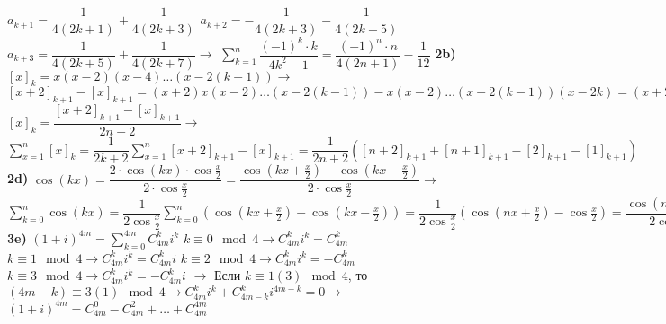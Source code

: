 \documentclass[12pt,a4paper,fleqn]{article}
\begin{document}
$a_{k + 1} = \dfrac{1}{4(2k + 1)} + \dfrac{1}{4(2k + 3)}$ \newline
$a_{k + 2} = - \dfrac{1}{4(2k + 3)} - \dfrac{1}{4(2k + 5)}$ \newline
$a_{k + 3} = \dfrac{1}{4(2k + 5)} + \dfrac{1}{4(2k + 7)} \rightarrow$ \newline
$\sum_{k = 1}^n \dfrac{(-1)^k \cdot k}{4k^2 - 1} = \dfrac{(-1)^n \cdot n}{4(2n + 1)} -\dfrac{1}{12}$ \newline \newline
{\bf 2b)} $[x]_k = x(x-2)(x-4)\ldots(x - 2(k - 1)) \rightarrow$ \newline
$[x + 2]_{k + 1} - [x]_{k + 1} = (x+2)x(x-2) \ldots (x - 2(k-1)) - x(x-2)\ldots (x - 2(k -1))(x - 2k) = (x + 2 - x + 2k)x(x-2)\ldots(x-2(k-1)) = (2k + 2)[x]_k \rightarrow$ \newline
$[x]_k = \dfrac{[x+2]_{k + 1} - [x]_{k + 1}}{2n + 2} \rightarrow$ \newline
$\sum_{x=1}^n [x]_k = \dfrac{1}{2k + 2} \sum_{x = 1}^n [x+2]_{k+1} - [x]_{k+1} = \dfrac{1}{2n + 2} ([n+2]_{k+1} + [n+1]_{k+1} - [2]_{k+1} - [1]_{k+1})$ \newline \newline
{\bf 2d)} $\cos(kx) = \dfrac{2\cdot \cos (kx) \cdot \cos \frac{x}{2}}{2 \cdot \cos \frac{x}{2}} = \dfrac{\cos (kx + \frac{x}{2}) - \cos (kx - \frac{x}{2})}{2 \cdot \cos \frac{x}{2}} \rightarrow$ \newline
$\sum_{k = 0}^n \cos (kx) = \dfrac{1}{2\cos \frac{x}{2}} \sum_{k=0}^n(\cos (kx + \frac{x}{2}) - \cos (kx - \frac{x}{2})) = \dfrac{1}{2\cos\frac{x}{2}} (\cos (nx + \frac{x}{2})- \cos \frac{x}{2}) = \dfrac{\cos (nx + \frac{x}{2})}{2\cos\frac{x}{2}} - \dfrac{1}{2}$ \newline \newline
{\bf 3e)} $(1 + i)^{4m} = \sum_{k = 0}^{4m} C_{4m}^k i^k$ \newline
$k \equiv 0 \mod 4 \rightarrow C_{4m}^k i^k = C_{4m}^k$ \newline
$k \equiv 1 \mod 4 \rightarrow C_{4m}^k i^k = C_{4m}^k i$ \newline
$k \equiv 2 \mod 4 \rightarrow C_{4m}^k i^k = -C_{4m}^k$ \newline
$k \equiv 3 \mod 4 \rightarrow C_{4m}^k i^k = -C_{4m}^k i$ \newline
$\rightarrow$ Если $k \equiv 1 (3) \mod 4$, то $(4m - k) \equiv 3(1) \mod 4 \rightarrow C_{4m}^k i^k + C_{4m - k}^k i^{4m - k} = 0 \rightarrow$ \newline
$(1 + i)^{4m} = C_{4m}^0 - C_{4m}^2 + \ldots + C_{4m}^{4m}$ \newline \newline
\end{document}
